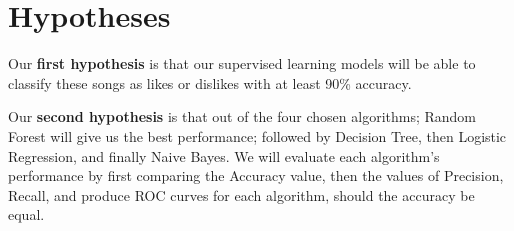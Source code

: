 \section{Hypotheses}
Our \textbf{first hypothesis} is that our supervised learning models will be able to classify these songs as likes or dislikes with at least 90\% accuracy.

Our \textbf{second hypothesis} is that out of the four chosen algorithms; Random Forest will give us the best performance; followed by Decision Tree, then Logistic Regression, and finally Naive Bayes. We will evaluate each algorithm's performance by first comparing the Accuracy value, then the values of Precision, Recall, and produce ROC curves for each algorithm, should the accuracy be equal.